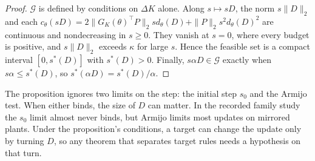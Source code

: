 \begin{proof}
$\mathcal G$ is defined by conditions on $\Delta K$ alone. Along $s\mapsto sD$, the
norm $s\|D\|_2$ and each $c_\theta(sD)=2\|G_K(\theta)^\top P\|_2sd_\theta(D)
+\|P\|_2s^2d_\theta(D)^2$ are continuous and nondecreasing in $s\ge0$. They vanish at
$s=0$, where every budget is positive, and $s\|D\|_2$ exceeds $\kappa$ for large $s$.
Hence the feasible set is a compact interval $[0,s^*(D)]$ with $s^*(D)>0$. Finally,
$s\alpha D\in\mathcal G$ exactly when $s\alpha\le s^*(D)$, so
$s^*(\alpha D)=s^*(D)/\alpha$.
\end{proof}

The proposition ignores two limits on the step: the initial step $s_0$ and the Armijo
test. When either binds, the size of $D$ can matter. In the recorded family study the
$s_0$ limit almost never binds, but Armijo limits most updates on mirrored plants.
Under the proposition's conditions, a target can change the update only by turning
$D$, so any theorem that separates target rules needs a hypothesis on that turn.
